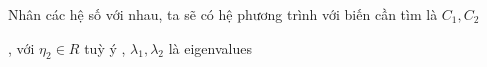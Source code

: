 \documentclass[class=article, crop=false]{standalone}
\begin{document}
    Nhân các hệ số với nhau, ta sẽ có hệ phương trình với biến cần tìm là $C_1, C_2$
    \begin{center}
        , với $\eta_2 \in R$ tuỳ ý
        , $\lambda_1, \lambda_2$ là eigenvalues
    \end{center}


\end{document}
